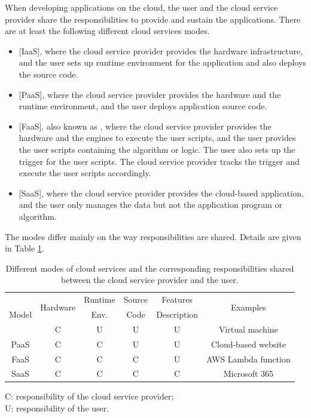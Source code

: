 When developing applications on the cloud, the user and the cloud service provider share the responsibilities to provide and sustain the applications. There are at least the following different cloud services modes. 
\begin{itemize}
	\item {}[IaaS], where the cloud service provider provides the hardware infrastructure, and the user sets up runtime environment for the application and also deploys the source code.
	\item {}[PaaS], where the cloud service provider provides the hardware and the runtime environment, and the user deploys application source code.
	\item {}[FaaS], also known as , where the cloud service provider provides the hardware and the engines to execute the user scripts, and the user provides the user scripts containing the algorithm or logic. The user also sets up the trigger for the user scripts. The cloud service provider tracks the trigger and execute the user scripts accordingly.
	\item {}[SaaS], where the cloud service provider provides the cloud-based application, and the user only manages the data but not the application program or algorithm.
\end{itemize}
The modes differ mainly on the way responsibilities are shared. Details are given in Table \ref{tab:cloudservicetier}.

\begin{table}[!htb]
	\centering
	\caption{Different modes of cloud services and the corresponding responsibilities shared between the cloud service provider and the user.} \label{tab:cloudservicetier}
	\begin{tabularx}{\textwidth}{cccccc}
		\hline
		\multirow{3}{*}{Model} & \multirow{2}{*}{Hardware} & Runtime & Source & Features & \multirow{2}{*}{Examples} \\ 
		& & Env. & Code & Description & \\ \hline
		IaaS & C & U & U & U & Virtual machine \\
		PaaS & C & C & U & U & Cloud-based website \\
		FaaS & C & C & C & U & AWS Lambda function \\
		SaaS & C & C & C & C & Microsoft 365 \\
		\hline
	\end{tabularx}
	\begin{flushleft}
		\footnotesize
		C: responsibility of the cloud service provider; \\
		U: responsibility of the user.
	\end{flushleft}
\end{table}

